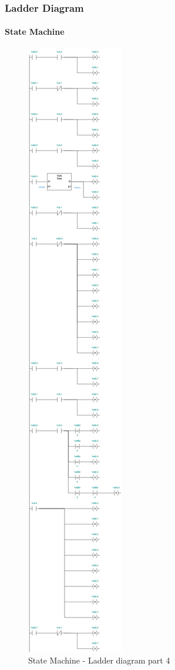 \documentclass[12pt]{beamer}
\begin{document}
\begin{frame}
\frametitle{Ladder Diagram}
\framesubtitle{State Machine}
\begin{figure}
    \centering
    \includegraphics[trim={0 65cm 0 33cm}, clip, scale=.5]{img/Ladder_diagram_2.jpg}
    \caption{State Machine - Ladder diagram part 4}
    \label{fig:ladder24}
\end{figure}
\end{frame}
\end{document}
